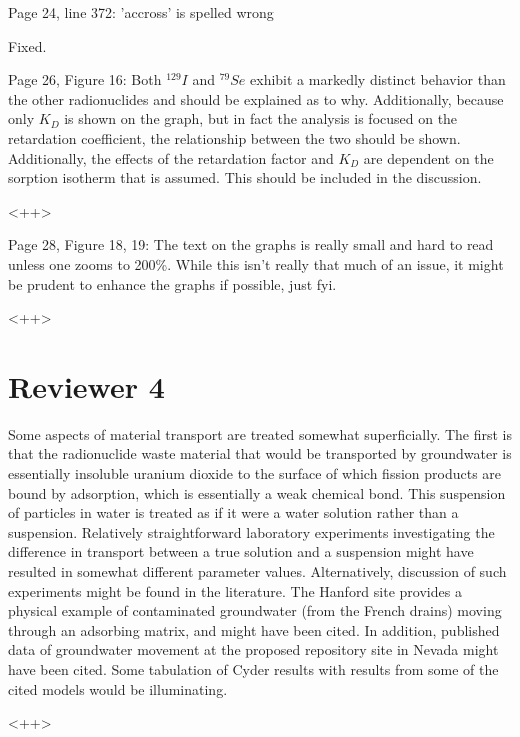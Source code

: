 \documentclass[answers,12pt]{exam}
\begin{document}
\begin{questions}
\question Page 24, line 372: 'accross' is spelled wrong 
\begin{solution}
Fixed.
\end{solution} 
 
\question Page  26,  Figure  16:  Both  $^{129}I$  and  $^{79}Se$  exhibit  a  markedly  distinct  behavior  than  the  other  radionuclides 
and  should  be  explained  as  to  why.  Additionally,  because  only  
$K_D$ is shown on the graph, but in fact the 
analysis  is  focused  on  the  retardation  coefficient,  the  relationship  between  the  two  should  be  shown. 
Additionally,  the  effects  of  the  retardation  factor  and  $K_D$  are dependent on the sorption isotherm that is 
assumed. This should be included in the discussion.  
\begin{solution}
<++>
\end{solution} 
 

\question 
Page 28, Figure 18, 19: The text on the graphs is really small and hard to read unless one zooms to 200\%. 
While  this  isn't  really  that  much  of  an  issue,  it  might  be  prudent  to  enhance  the  graphs  if  possible,  just 
fyi.  
\begin{solution}
        <++>
\end{solution} 

\section*{Reviewer 4}

\question  Some aspects of material transport are treated somewhat superficially. The
first is that the radionuclide waste material that would be transported by
groundwater is essentially insoluble uranium dioxide to the surface of which
fission products are bound by adsorption, which is essentially a weak chemical
bond.  This suspension of particles in water is treated as if it were a water
solution rather than a suspension.  Relatively straightforward laboratory
experiments investigating the difference in transport between a true solution
and a suspension might have resulted in somewhat different parameter values.
Alternatively, discussion of such experiments might be found in the literature.
The Hanford site provides a physical example of contaminated groundwater (from
the French drains) moving through an adsorbing matrix, and might have been
cited. In addition, published data of groundwater movement at the proposed
repository site in Nevada might have been cited.  Some tabulation of Cyder
results with results from some of the cited models would be illuminating. 
\begin{solution}
<++>
\end{solution}

\end{questions}
  
\end{document}
